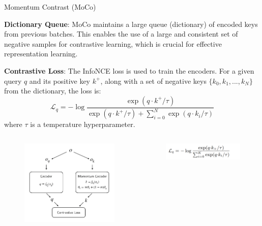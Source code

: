 \begin{frame}[allowframebreaks]{Momentum Contrast (MoCo)}
    \framebreak

    \textbf{Dictionary Queue}: MoCo maintains a large queue (dictionary) of encoded keys from previous batches. This enables the use of a large and consistent set of negative samples for contrastive learning, which is crucial for effective representation learning.
    
    \vspace{0.5em}
    
    \textbf{Contrastive Loss}: The InfoNCE loss is used to train the encoders. For a given query $q$ and its positive key $k^+$, along with a set of negative keys $\{k_0, k_1, ..., k_N\}$ from the dictionary, the loss is:
        \[
            \mathcal{L}_{q} = -\log \frac{\exp(q \cdot k^+ / \tau)}{\exp(q \cdot k^+ / \tau) + \sum_{i=0}^{N} \exp(q \cdot k_i / \tau)}
        \]
        where $\tau$ is a temperature hyperparameter.

    \framebreak

    \begin{columns}
            \begin{figure}
                \centering
                \includegraphics[width=1\linewidth,height=0.9\textheight,keepaspectratio]{images/ssl/slide_67_1_img.png}
            \end{figure}
            \begin{figure}
                \centering
                \includegraphics[width=1\linewidth,height=0.9\textheight,keepaspectratio]{images/ssl/slide_67_2_img.png}
            \end{figure}
    \end{columns}
    \framebreak


\end{frame}
